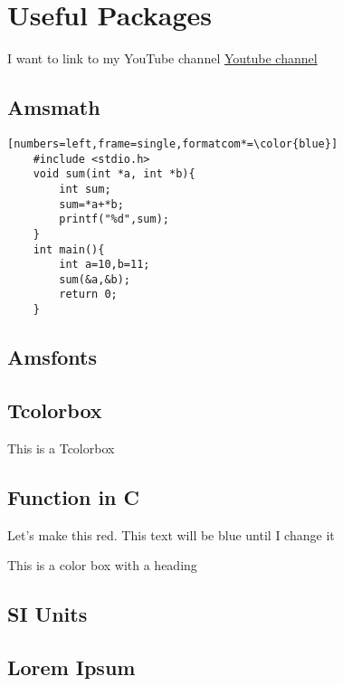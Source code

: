 \documentclass{report}
\begin{document}
\tableofcontents
\chapter{Useful Packages}
I want to link to my YouTube channel \href{https://www.youtube.com/watch?v=331YxgOJUGw&t=0s}{Youtube channel}
\section{Amsmath}
\begin{Verbatim}[numbers=left,frame=single,formatcom*=\color{blue}]
    #include <stdio.h>
    void sum(int *a, int *b){
        int sum;
        sum=*a+*b;
        printf("%d",sum);
    }
    int main(){
        int a=10,b=11;
        sum(&a,&b);
        return 0;
    }
\end{Verbatim}
\section{Amsfonts}
\section{Tcolorbox}
\begin{tcolorbox}
This is a Tcolorbox
\end{tcolorbox}
\newpage
\section{Function in C}
Let's make this \color{red}{position} red. \color{blue} This text will be blue until I change it
\begin{tcolorbox}[colback=red!5!white,colframe=red!80!white,title=My nice heading]
This is a color box with a heading
\end{tcolorbox}
\section{SI Units}
\section{Lorem Ipsum}
\lipsum[1-4]
\end{document}
